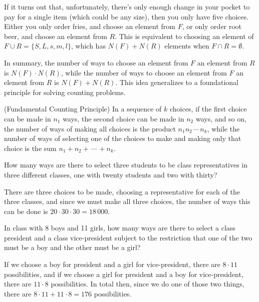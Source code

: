 If it turns out that, unfortunately, there's only enough change in your pocket to pay for a single item (which could be any size), then you only have five choices. Either you only order fries, and choose an element from $F$, or only order root beer, and choose an element from $R$. This is equivalent to choosing an element of $F \cup R = \{S,L,s,m,l\}$, which has $N(F)+ N(R)$ elements when $F \cap R = \emptyset$.

In summary, the number of ways to choose an element from $F$  an element from $R$ is $N(F) \cdot N(R)$, while the number of ways to choose an element from $F$  an element from $R$ is $N(F)+N(R)$. This idea generalizes to a foundational principle for solving counting problems.

\begin{proposition}(Fundamental Counting Principle) \label{FundamentalCountingPrinciple} In a sequence of $k$ choices, if the first choice can be made in $n_1$ ways, the second choice can be made in $n_2$ ways, and so on, the number of ways of making all choices is the product $n_1 n_2 \,\cdots\, n_k$, while the number of ways of selecting one of the choices to make and making only that choice is the sum $n_1 + n_2 + \,\cdots\, + n_k$.
\end{proposition}

\begin{example}
How many ways are there to select three students to be class representatives in three different classes, one with twenty students and two with thirty?

There are three choices to be made, choosing a representative for each of the three classes, and since we must make all three choices, the number of ways this can be done is $20 \cdot 30 \cdot 30 = 18\,000$.
\end{example}

\begin{example}
In class with 8 boys and 11 girls, how many ways are there to select a class president and a class vice-president subject to the restriction that one of the two must be a boy and the other must be a girl?

If we choose a boy for president and a girl for vice-president, there are $8 \cdot 11$ possibilities, and if we choose a girl for president and a boy for vice-president, there are $11 \cdot 8$ possibilities. In total then, since we do one of those two things, there are $8 \cdot 11 + 11 \cdot 8 = 176$ possibilities. 
\end{example}

